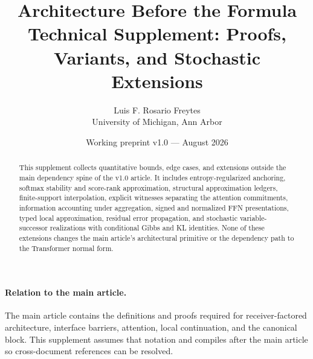 
\usepackage{xr-hyper}


\title{\textbf{Architecture Before the Formula}\\
\large Technical Supplement: Proofs, Variants, and Stochastic Extensions}
\author{Luis F. Rosario Freytes\\University of Michigan, Ann Arbor}
\date{Working preprint v1.0 --- August 2026}


\maketitle

\begin{abstract}
This supplement collects quantitative bounds, edge cases, and extensions outside the main dependency spine of the v1.0 article. It includes entropy-regularized anchoring, softmax stability and score-rank approximation, structural approximation ledgers, finite-support interpolation, explicit witnesses separating the attention commitments, information accounting under aggregation, signed and normalized FFN presentations, typed local approximation, residual error propagation, and stochastic variable-successor realizations with conditional Gibbs and KL identities. None of these extensions changes the main article's architectural primitive or the dependency path to the Transformer normal form.
\end{abstract}

\paragraph{Relation to the main article.}
The main article contains the definitions and proofs required for receiver-factored architecture, interface barriers, attention, local continuation, and the canonical block. This supplement assumes that notation and compiles after the main article so cross-document references can be resolved.










